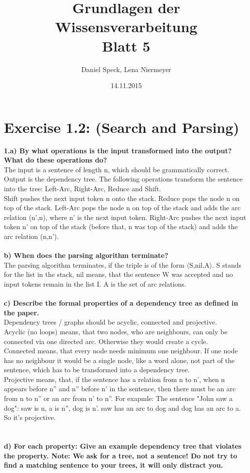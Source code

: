 \documentclass[10pt,a4paper]{article}
\title{\textbf{\huge Grundlagen der Wissensverarbeitung
		\\\Large Blatt 5}}
\author{Daniel Speck, Lena Niermeyer}
\date{14.11.2015}
\begin{document}
		
	\maketitle
		
	\section*{Exercise 1.2: (Search and Parsing)}
	

\textbf{1.a) By what operations is the input transformed into the output? What do these operations do?}
\\
The input is a sentence of length n, which should be grammatically correct. Output is the dependency tree. The following operations transform the sentence into the tree:
Left-Arc, Right-Arc, Reduce and Shift.
\\
Shift pushes the next input token n onto the stack.
Reduce pops the node n on top of the stack.
Left-Arc pops the node n on top of the stack and adds the arc relation (n',n), where n' is the next input token.
Right-Arc pushes the next input token n' on top of the stack (before that, n was top of the stack) and adds the arc relation (n,n').
\\
\\
\textbf{b) When does the parsing algorithm terminate?} \\
The parsing algorithm terminates, if the triple is of the form $\langle$S,nil,A$\rangle$. S stands for the list in the stack, nil means, that the sentence W was accepted and no input tokens remain in the list I. A is the set of arc relations.
\\
\\
\textbf{c) Describe the formal properties of a dependency tree as defined in the paper.}\\
Dependency trees / graphs should be acyclic, connected and projective.\\
Acyclic (no loops) means, that two nodes, who are neighbours, can only be connected via one directed arc. Otherwise they would create a cycle. \\
Connected means, that every node needs minimum one neighbour. If one node has no neighbour it would be a single node, like a word alone, not part of the sentence, which has to be transformed into a dependency tree. \\
Projective means, that, if the sentence has a relation from n to n', when n appears before n'' and n'' before n' in the sentence, then there must be an arc from n to n'' or an arc from n' to n''. For exapmle: The sentence "John saw a dog": saw is n, a is n'', dog is n'. saw has an arc to dog and dog has an arc to a. So it's projective. \\
\\
\\
\textbf{d) For each property: Give an example dependency tree that violates the property.
Note: We ask for a tree, not a sentence! Do not try to find a matching sentence to your trees, it will only distract you.}
\end{document}
